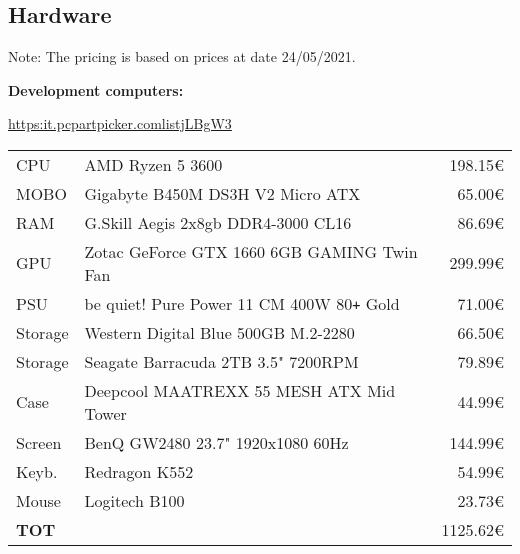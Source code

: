 \subsection{Hardware}
Note: The pricing is based on prices at date 24/05/2021.

\textbf{Development computers:}

\href{https://it.pcpartpicker.com/list/jLBgW3}{https:\/\/it.pcpartpicker.com\/list\/jLBgW3}

\begin{tabular}{|l|l|r|}
	\hline
	CPU      & AMD Ryzen 5 3600                                & 198.15€ \\
	MOBO     & Gigabyte B450M DS3H V2 Micro ATX                &  65.00€ \\
	RAM      & G.Skill Aegis 2x8gb DDR4-3000 CL16              &  86.69€ \\
	GPU      & Zotac GeForce GTX 1660 6GB GAMING Twin Fan      & 299.99€ \\
	PSU      & be quiet! Pure Power 11 CM 400W 80\verb!+! Gold &  71.00€ \\
	Storage  & Western Digital Blue 500GB M.2-2280             &  66.50€ \\
	Storage  & Seagate Barracuda 2TB 3.5" 7200RPM              &  79.89€ \\
	Case     & Deepcool MAATREXX 55 MESH ATX Mid Tower         &  44.99€ \\
	Screen   & BenQ GW2480 23.7" 1920x1080 60Hz                & 144.99€ \\
	Keyb.    & Redragon K552                                   &  54.99€ \\
	Mouse    & Logitech B100                                   &  23.73€ \\
	\hline
	\textbf{TOT} & & 1125.62€ \\
	\hline
\end{tabular}


\pagebreak 